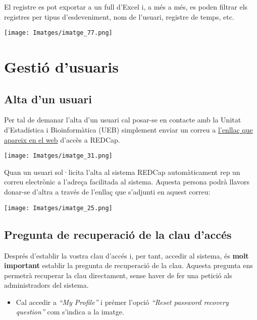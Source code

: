 \documentclass[
]{article}
\providecommand{\tightlist}{%
  \setlength{\itemsep}{0pt}\setlength{\parskip}{0pt}}
\begin{document}
El registre es pot exportar a un full d'Excel i, a més a més, es poden filtrar els registres per tipus d'esdeveniment, nom de l'usuari, registre de temps, etc.

\texttt{[image: Imatges/imatge\_77.png]}

\hypertarget{gestiuxf3-dusuaris}{%
\section{\texorpdfstring{\textbf{Gestió d'usuaris}}{Gestió d'usuaris}}\label{gestiuxf3-dusuaris}}

\hypertarget{alta-dun-usuari}{%
\subsection{\texorpdfstring{\textbf{Alta d'un usuari}}{Alta d'un usuari}}\label{alta-dun-usuari}}

Per tal de demanar l'alta d'un usuari cal posar-se en contacte amb la Unitat d'Estadística i Bioinformàtica (UEB) simplement enviar un correu a \href{mailto:ueb@vhir.org?subject=Alta\%20usuari\%20RedCAP}{l'enllaç que apareix en el web} d'accès a REDCap.

\texttt{[image: Imatges/imatge\_31.png]}

Quan un usuari sol·licita l'alta al sistema REDCap automàticament rep un correu electrònic a l'adreça facilitada al sistema. Aquesta persona podrà llavors donar-se d'altra a través de l'enllaç que s'adjunti en aquest correu:

\texttt{[image: Imatges/imatge\_25.png]}

\hypertarget{pregunta-de-recuperaciuxf3-de-la-clau-daccuxe9s}{%
\subsection{\texorpdfstring{\textbf{Pregunta de recuperació de la clau d'accés}}{Pregunta de recuperació de la clau d'accés}}\label{pregunta-de-recuperaciuxf3-de-la-clau-daccuxe9s}}

Després d'establir la vostra clau d'accés i, per tant, accedir al sistema, és \textbf{molt important} establir la pregunta de recuperació de la clau. Aquesta pregunta ens permetrà recuperar la clau directament, sense haver de fer una petició als administradors del sistema.

\begin{itemize}
\tightlist
\item
  Cal accedir a \emph{``My Profile''} i prémer l'opció \emph{``Reset password recovery question''} com s'indica a la imatge.
\end{itemize}
\end{document}
